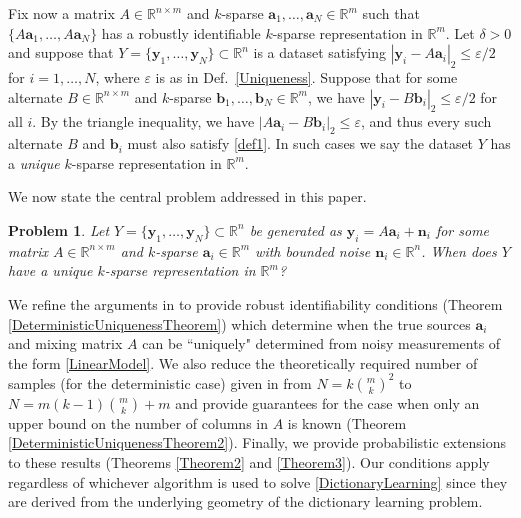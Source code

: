 \documentclass[journal, onecolumn]{IEEEtran}
\newtheorem{problem}{Problem}
\begin{document}
Fix now a matrix $A \in \mathbb{R}^{n \times m}$ and $k$-sparse $\mathbf{a}_1, \ldots, \mathbf{a}_N \in \mathbb{R}^m$ such that $\{A\mathbf{a}_1, \ldots, A\mathbf{a}_N\}$ has a robustly identifiable $k$-sparse representation in $\mathbb{R}^m$. Let $\delta > 0$ and suppose that $Y = \{\mathbf{y}_1, \ldots, \mathbf{y}_N\} \subset \mathbb{R}^n$ is a dataset satisfying $|\mathbf{y}_i - A\mathbf{a}_i|_2 \leq \varepsilon/2$ for $i = 1, \ldots, N$, where $\varepsilon$ is as in Def.~\ref{Uniqueness}. %
Suppose that for some alternate $B \in \mathbb{R}^{n \times m}$ and $k$-sparse $\mathbf{b}_1, \ldots, \mathbf{b}_N \in \mathbb{R}^m$, we have $|\mathbf{y}_i - B\mathbf{b}_i|_2 \leq \varepsilon/2$ for all $i$. 
By the triangle inequality, we have $|A\mathbf{a}_i - B\mathbf{b}_i|_2 \leq \varepsilon$, and thus every such alternate $B$ and $\mathbf{b}_i$ must also satisfy \eqref{def1}. 
In such cases we say the dataset $Y$ has a \textit{unique} $k$-sparse representation in $\mathbb{R}^m$. 

We now state the central problem addressed in this paper.

\begin{problem}\label{DUTproblem}
Let $Y = \{\mathbf{y}_1, \ldots, \mathbf{y}_N \} \subset \mathbb{R}^n$ be generated as $\mathbf{y}_i = A\mathbf{a}_i  + \mathbf{n}_i$ for some matrix $A \in \mathbb{R}^{n \times m}$ and $k$-sparse $\mathbf{a}_i \in \mathbb{R}^m$ with bounded noise $\mathbf{n}_i \in \mathbb{R}^n$. When does $Y$ have a unique $k$-sparse representation in $\mathbb{R}^m$?
\end{problem}

We refine the arguments in \cite{Hillar15} to provide robust identifiability conditions (Theorem \ref{DeterministicUniquenessTheorem}) which determine when the true sources $\mathbf{a}_i$ and mixing matrix $A$ can be ``uniquely" determined from noisy measurements of the form \eqref{LinearModel}. We also reduce the theoretically required number of samples (for the deterministic case) given in \cite{Hillar15} from $N=k{m \choose k}^2$ to $N = m(k-1){m \choose k}+m$ and provide guarantees for the case when only an upper bound on the number of columns in $A$ is known (Theorem \ref{DeterministicUniquenessTheorem2}). Finally, we provide probabilistic extensions to these results (Theorems \ref{Theorem2} and \ref{Theorem3}). Our conditions apply regardless of whichever algorithm is used to solve \eqref{DictionaryLearning} since they are derived from the underlying geometry of the dictionary learning problem. 
\end{document}
